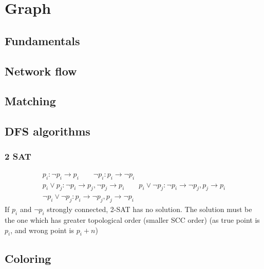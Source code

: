 \chapter{Graph}

\section{Fundamentals}

\section{Network flow}

\section{Matching}

\section{DFS algorithms}
	\subsection{2 SAT}
	\begin{align*}
		p_i: \neg p_i \to p_i \qquad \neg p_i : p_i \to \neg p_i \\
		p_i \lor p_j: \neg p_i \to p_j, \neg p_j \to p_i \qquad p_i \lor \neg p_j: \neg p_i \to \neg p_j, p_j \to p_i \\
		\neg p_i \lor \neg p_j: p_i \to \neg p_j, p_j \to \neg p_i
	\end{align*}
	If $p_i$ and $\neg p_i$ strongly connected, 2-SAT has no solution. The solution must be the one which has greater topological order (smaller SCC order) (as true point is $p_i$, and wrong point is $p_i + n$)
\section{Coloring}


